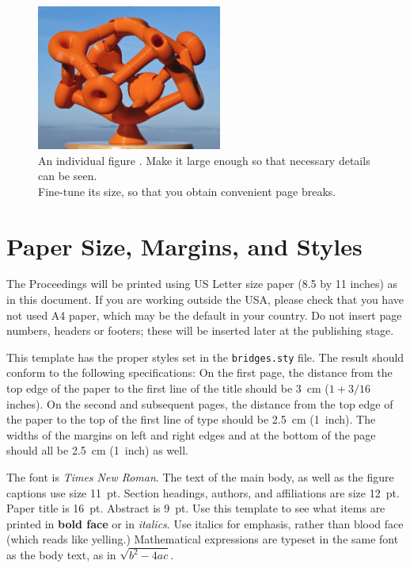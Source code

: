 \documentclass[letterpaper,11pt]{article}
\begin{document}
\begin{figure}[h!tbp]
	\centering
	\includegraphics[width=2.4in]{figures/figure1.jpg}
	\caption{An individual figure \cite{Sequin2016}. Make it large enough so that necessary 
	details can be seen.\\ Fine-tune its size, so that you obtain convenient page breaks.}
	\label{fig:1}
\end{figure}



\section*{Paper Size, Margins, and Styles}

The Proceedings will be printed using US Letter size paper (8.5 by 11
inches) as in this document. If you are working outside the USA, please
check that you have not used A4 paper, which may be the default in your
country. Do not insert page numbers, headers or footers; these will be
inserted later at the publishing stage.

This template has the proper styles set in the \texttt{bridges.sty} file. 
The result should conform to the following specifications: On the first page, 
the distance from the top edge of the paper to the first line of the title should 
be 3~cm ($1+3/16$ inches). On the second and subsequent pages, the distance 
from the top edge of the paper to the top of the first line of type should be
2.5~cm (1~inch). The widths of the margins on left and right edges and
at the bottom of the page should all be 2.5~cm (1~inch) as well.

The font is \emph{Times New Roman}. The text of the main body,
as well as the figure captions use size 11~pt. Section headings,
authors, and affiliations are size 12~pt. Paper title is 16~pt. Abstract
is 9~pt. Use this template to see what items are printed in \textbf{bold
face} or in \emph{italics}. Use italics for emphasis, rather than blood face (which reads like yelling.)
Mathematical expressions are typeset 
in the same font as the body text, as in $\sqrt{b^2-4ac}$. 
\end{document}
